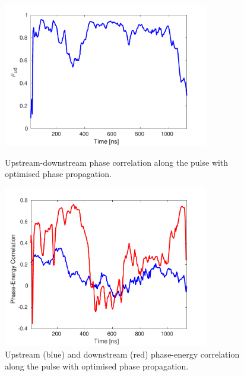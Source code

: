 \begin{figure}
  \centering
  \includegraphics[width=0.8\textwidth]{Figures/propagation/bestProp_corrAlong}
  \caption{Upstream-downstream phase correlation along the pulse with optimised phase propagation.}
  \label{f:bestProp_corrAlong}
  \includegraphics[width=0.8\textwidth]{Figures/propagation/bestProp_enCorrAlong}
  \caption{Upstream (blue) and downstream (red) phase-energy correlation along the pulse with optimised phase propagation.}
  \label{f:bestProp_enCorrAlong}
\end{figure}

